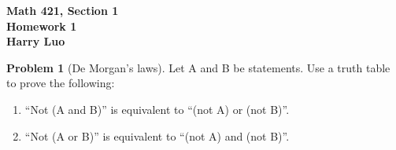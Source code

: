 \documentclass[12pt]{article}
\theoremstyle{definition}\newtheorem{problem}{Problem}
\begin{document}

\begin{center}
\bfseries Math 421, Section 1 
\\ 
Homework 1
\\ 
Harry Luo %
\\ [24pt] 
\end{center}

%
\begin{problem}[De Morgan's laws]
Let A and B be statements.  Use a truth table to prove the following:
\begin{enumerate}
\item ``Not (A and B)'' is equivalent to ``(not A) or (not B)''.
\item ``Not (A or B)'' is equivalent to ``(not A) and (not B)''.
\end{enumerate}
\end{problem}
\end{document}
